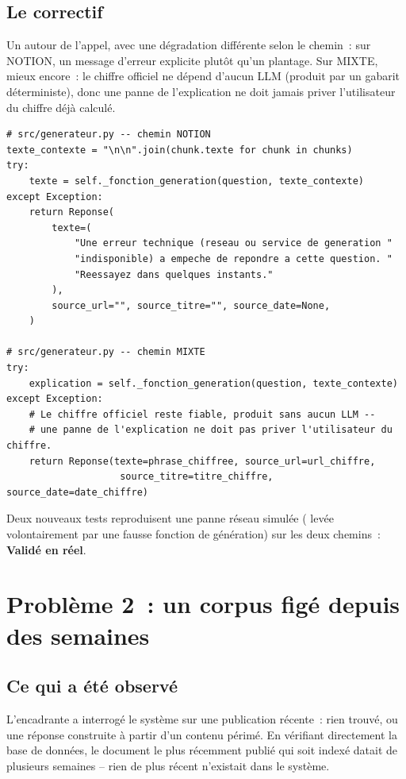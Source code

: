 \documentclass[11pt,a4paper]{article}
\newcommand{\code}[1]{\texttt{\detokenize{#1}}}
\newcommand{\ok}{\textcolor{okgreen}{\textbf{Valid\'e en r\'eel}}}
\begin{document}
\subsection{Le correctif}

Un \code{try/except} autour de l'appel, avec une d\'egradation diff\'erente selon le
chemin~: sur NOTION, un message d'erreur explicite plut\^ot qu'un plantage. Sur MIXTE,
mieux encore~: le chiffre officiel ne d\'epend d'aucun LLM (produit par un gabarit
d\'eterministe), donc une panne de l'explication ne doit jamais priver l'utilisateur du
chiffre d\'ej\`a calcul\'e.

\begin{lstlisting}
# src/generateur.py -- chemin NOTION
texte_contexte = "\n\n".join(chunk.texte for chunk in chunks)
try:
    texte = self._fonction_generation(question, texte_contexte)
except Exception:
    return Reponse(
        texte=(
            "Une erreur technique (reseau ou service de generation "
            "indisponible) a empeche de repondre a cette question. "
            "Reessayez dans quelques instants."
        ),
        source_url="", source_titre="", source_date=None,
    )

# src/generateur.py -- chemin MIXTE
try:
    explication = self._fonction_generation(question, texte_contexte)
except Exception:
    # Le chiffre officiel reste fiable, produit sans aucun LLM --
    # une panne de l'explication ne doit pas priver l'utilisateur du chiffre.
    return Reponse(texte=phrase_chiffree, source_url=url_chiffre,
                    source_titre=titre_chiffre, source_date=date_chiffre)
\end{lstlisting}

Deux nouveaux tests reproduisent une panne r\'eseau simul\'ee (\code{ConnectionError}
lev\'ee volontairement par une fausse fonction de g\'en\'eration) sur les deux chemins~:
\ok{}.

\section{Probl\`eme 2~: un corpus fig\'e depuis des semaines}

\subsection{Ce qui a \'et\'e observ\'e}

L'encadrante a interrog\'e le syst\`eme sur une publication r\'ecente~: rien trouv\'e, ou
une r\'eponse construite \`a partir d'un contenu p\'erim\'e. En v\'erifiant directement la
base de donn\'ees, le document le plus r\'ecemment publi\'e qui soit index\'e datait de
plusieurs semaines -- rien de plus r\'ecent n'existait dans le syst\`eme.
\end{document}
